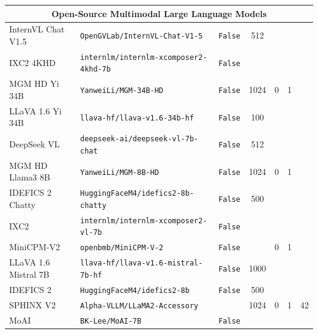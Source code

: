 \begin{table}[h]
{\begin{tabular}{ll|ccccc@{}}
\midrule
\multicolumn{7}{c}{\textbf{Open-Source Multimodal Large Language Models}} \\
\midrule
InternVL Chat V1.5 \cite{chen2024far} & \texttt{OpenGVLab/InternVL-Chat-V1-5} & \texttt{False} & 512 &  &  &   \\
IXC2 4KHD \cite{dong2024internlmxcomposer24khd} & \texttt{internlm/internlm-xcomposer2-4khd-7b} & \texttt{False} &  &  &  &    \\
MGM HD Yi 34B \cite{li2024minigemini} & \texttt{YanweiLi/MGM-34B-HD} & \texttt{False} & 1024 & 0 & 1 &    \\
LLaVA 1.6 Yi 34B \cite{liu2024llavanext} & \texttt{llava-hf/llava-v1.6-34b-hf} & \texttt{False} & 100 &  &  &    \\
DeepSeek VL \cite{lu2024deepseekvl} & \texttt{deepseek-ai/deepseek-vl-7b-chat} & \texttt{False} & 512 &  &  &    \\
MGM HD Llama3 8B \cite{li2024minigemini} & \texttt{YanweiLi/MGM-8B-HD} & \texttt{False} & 1024 & 0 & 1 &    \\
IDEFICS 2 Chatty \cite{laurenccon2024matters} & \texttt{HuggingFaceM4/idefics2-8b-chatty} & \texttt{False} & 500 &  &  &    \\
IXC2 \cite{chen2023internvl} & \texttt{internlm/internlm-xcomposer2-vl-7b} & \texttt{False} &  &  &  &    \\
MiniCPM-V2 \cite{viscpm} & \texttt{openbmb/MiniCPM-V-2} & \texttt{False} &  & 0 & 1 &   \\
LLaVA 1.6 Mistral 7B \cite{liu2024llavanext} & \texttt{llava-hf/llava-v1.6-mistral-7b-hf} & \texttt{False} & 1000 &  &  &    \\
IDEFICS 2 \cite{laurenccon2024matters} & \texttt{HuggingFaceM4/idefics2-8b} & \texttt{False} & 500 &  &  &    \\
SPHINX V2 \cite{gao2024sphinxx} & \texttt{Alpha-VLLM/LLaMA2-Accessory} &  & 1024 & 0 & 1 & 42   \\
MoAI \cite{lee2024moai} & \texttt{BK-Lee/MoAI-7B} & \texttt{False} &  &  &  &   \\ 
\bottomrule
\hline
\end{tabular}
}
\label{tab:run_configurations}
\end{table}
\vspace{-3ex}
